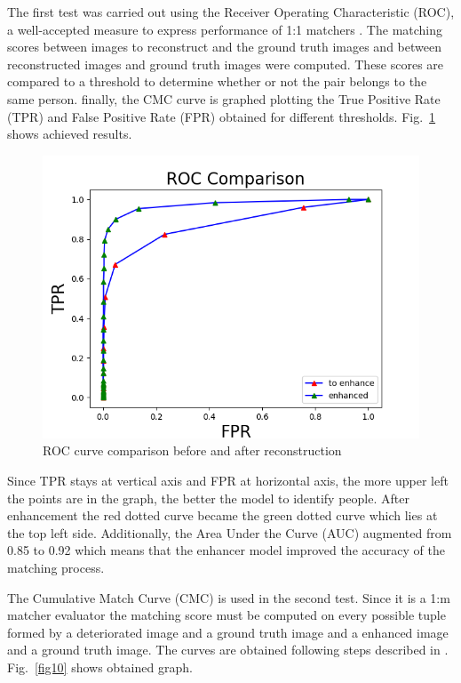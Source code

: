 \documentclass[a4paper,fleqn]{cas-dc}
\begin{document}
The first test was carried out using the Receiver Operating Characteristic (ROC), a well-accepted measure to express performance of 1:1 matchers \cite{RROCCMC}. The matching scores between images to reconstruct and the ground truth images and between reconstructed images and ground truth images were computed. These scores are compared to a threshold to determine whether or not the pair belongs to the same person. finally, the CMC curve is graphed plotting the True Positive Rate (TPR) and False Positive Rate (FPR) obtained for different thresholds. Fig.~\ref{fig9} shows achieved results.

\begin{figure}[htbp]
\centerline{\includegraphics[scale=0.4]{figs/roc_comparison.png}}
\caption{ROC curve comparison before and after reconstruction}
\label{fig9}
\end{figure}

Since TPR stays at vertical axis and FPR at horizontal axis, the more upper left the points are in the graph, the better the model to identify people. After enhancement the red dotted curve became the green dotted curve which lies at the top left side. Additionally, the Area Under the Curve (AUC) augmented from 0.85 to 0.92 which means that the enhancer model improved the accuracy of the matching process.

The Cumulative Match Curve (CMC) is used in the second test. Since it is a 1:m matcher evaluator the matching score must be computed on every possible tuple formed by a deteriorated image and a ground truth image and a enhanced image and a ground truth image. The curves are obtained following steps described in \cite{RROCCMC}. Fig.~\ref{fig10} shows obtained graph.
\end{document}
